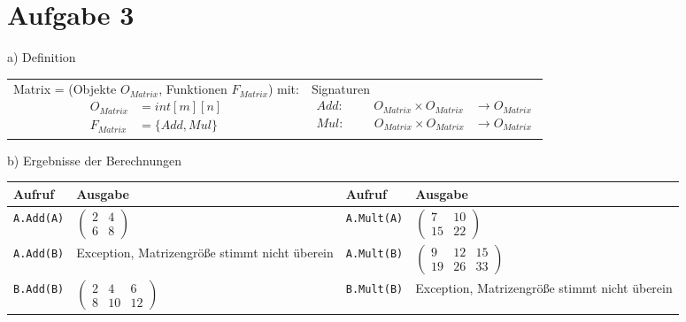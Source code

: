 \vspace{-1.5cm}

\section*{Aufgabe 3}
	a) Definition \\[0.25cm]
    
	\begin{tabularx}{\textwidth}{X X}
    	Matrix = (Objekte $O_{Matrix}$, Funktionen $F_{Matrix}$) mit:
        {\begin{align*}
            O_{Matrix} &= int[m][n] \\
            F_{Matrix} &= \{ Add, Mul\}
        \end{align*}}
        &
        Signaturen
        {\begin{align*}
            Add:\hspace{1cm} O_{Matrix} \times O_{Matrix} & \rightarrow O_{Matrix} \\
            Mul:\hspace{1cm} O_{Matrix} \times O_{Matrix} & \rightarrow O_{Matrix}
        \end{align*}}
    \end{tabularx}
    
    b) Ergebnisse der Berechnungen \\[0.25cm]
    \bgroup
	\def\arraystretch{1.1}
        \begin{tabularx}{\textwidth}{|l|X||l|X|}
            \hline
            \textbf{Aufruf} & \textbf{Ausgabe} & \textbf{Aufruf} & \textbf{Ausgabe} \\
            \hline
                \texttt{A.Add(A)} & $\begin{pmatrix} 2 & 4 \\ 6 & 8 \end{pmatrix}$ 
                    & 
                \texttt{A.Mult(A)} & $\begin{pmatrix} 7 & 10 \\ 15 & 22 \end{pmatrix}$ \\
            \hline
                \texttt{A.Add(B)} & Exception, Matrizengröße stimmt nicht überein
                    & 
                \texttt{A.Mult(B)} & $\begin{pmatrix} 9 & 12 & 15 \\ 19 & 26 & 33 \end{pmatrix}$ \\
            \hline
                \texttt{B.Add(B)} & $\begin{pmatrix} 2 & 4 & 6 \\ 8 & 10 & 12 \end{pmatrix}$ 
                    & 
                \texttt{B.Mult(B)} & Exception, Matrizengröße stimmt nicht überein \\
            \hline
        \end{tabularx}
    \egroup